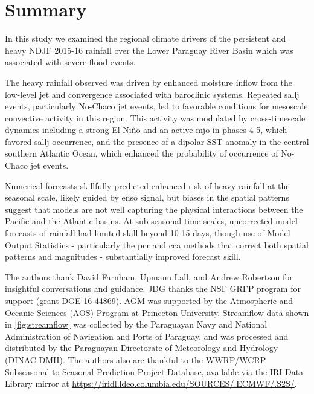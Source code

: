 \documentclass[twocol]{ametsoc}
\begin{document}

\section{Summary} \label{sec:summary}

In this study we examined the regional climate drivers of the persistent and heavy NDJF 2015-16 rainfall over the Lower Paraguay River Basin which was associated with severe flood events.

The heavy rainfall observed was driven by enhanced moisture inflow from the low-level jet and convergence associated with baroclinic systems.
Repeated \gls{sallj} events, particularly No-Chaco jet events, led to favorable conditions for mesoscale convective activity in this region.
This activity was modulated by cross-timescale dynamics including a strong El Ni\~{n}o and an active \gls{mjo}  in phases 4-5, which favored \gls{sallj} occurrence, and the presence of a dipolar SST anomaly in the central southern Atlantic Ocean, which enhanced the probability of occurrence of No-Chaco jet events.

Numerical forecasts skillfully predicted enhanced risk of heavy rainfall at the seasonal scale, likely guided by \gls{enso} signal, but biases in the spatial patterns suggest that models are not well capturing the physical interactions between the Pacific and the Atlantic basins.
At sub-seasonal time scales, uncorrected model forecasts of rainfall had limited skill beyond 10-15 days, though use of Model Output Statistics - particularly the \gls{pcr} and \gls{cca} methods that correct both spatial patterns and magnitudes - substantially improved forecast skill.


\acknowledgments
The authors thank David Farnham, Upmanu Lall, and Andrew Robertson for insightful conversations and guidance.
JDG thanks the NSF GRFP program for support (grant DGE 16-44869).
AGM was supported by the Atmospheric and Oceanic Sciences (AOS) Program at Princeton University.
Streamflow data shown in \cref{fig:streamflow} was collected by the Paraguayan Navy and National Administration of Navigation and Ports of Paraguay, and was processed and distributed by the Paraguayan Directorate of Meteorology and Hydrology (DINAC-DMH).
The authors also are thankful to the WWRP/WCRP Subseasonal-to-Seasonal Prediction Project Database, available via the IRI Data Library mirror at \url{https://iridl.ldeo.columbia.edu/SOURCES/.ECMWF/.S2S/}.
\end{document}
